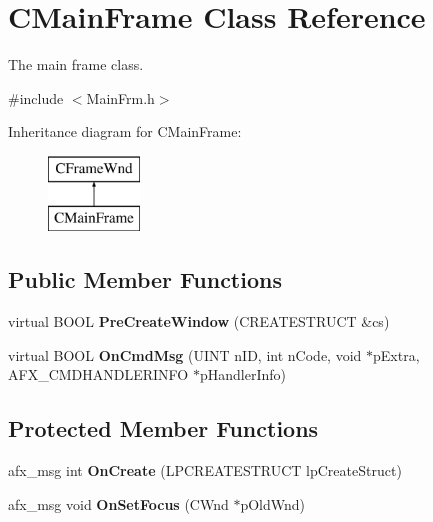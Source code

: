 \hypertarget{class_c_main_frame}{\section{C\+Main\+Frame Class Reference}
\label{class_c_main_frame}
}


The main frame class.  




{\ttfamily \#include $<$Main\+Frm.\+h$>$}

Inheritance diagram for C\+Main\+Frame\+:\begin{figure}[H]
\begin{center}
\leavevmode
\includegraphics[height=2.000000cm]{class_c_main_frame}
\end{center}
\end{figure}
\subsection*{Public Member Functions}
\begin{DoxyCompactItemize}
\item 
\hypertarget{class_c_main_frame_a549bf677c955c2898c3c683321633c16}{virtual B\+O\+O\+L {\bfseries Pre\+Create\+Window} (C\+R\+E\+A\+T\+E\+S\+T\+R\+U\+C\+T \&cs)}\label{class_c_main_frame_a549bf677c955c2898c3c683321633c16}

\item 
\hypertarget{class_c_main_frame_ade959eb0bab719bf06bb9b18ee407101}{virtual B\+O\+O\+L {\bfseries On\+Cmd\+Msg} (U\+I\+N\+T n\+I\+D, int n\+Code, void $\ast$p\+Extra, A\+F\+X\+\_\+\+C\+M\+D\+H\+A\+N\+D\+L\+E\+R\+I\+N\+F\+O $\ast$p\+Handler\+Info)}\label{class_c_main_frame_ade959eb0bab719bf06bb9b18ee407101}

\end{DoxyCompactItemize}
\subsection*{Protected Member Functions}
\begin{DoxyCompactItemize}
\item 
\hypertarget{class_c_main_frame_a48666466fd37412fcaeff75c3b12e0ed}{afx\+\_\+msg int {\bfseries On\+Create} (L\+P\+C\+R\+E\+A\+T\+E\+S\+T\+R\+U\+C\+T lp\+Create\+Struct)}\label{class_c_main_frame_a48666466fd37412fcaeff75c3b12e0ed}

\item 
\hypertarget{class_c_main_frame_adc353a3d1fc497fbc009b6d9e6914a82}{afx\+\_\+msg void {\bfseries On\+Set\+Focus} (C\+Wnd $\ast$p\+Old\+Wnd)}\label{class_c_main_frame_adc353a3d1fc497fbc009b6d9e6914a82}

\end{DoxyCompactItemize}
